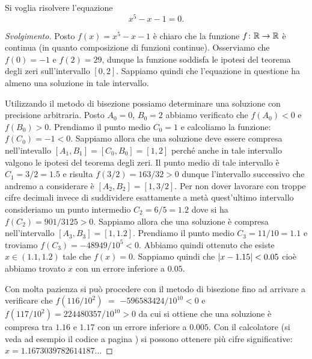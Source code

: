 \begin{example}\label{ex:75445}
Si voglia risolvere l'equazione
\[
  x^5-x-1=0.
\]
\end{example}
%
\begin{proof}[Svolgimento]
Posto $f(x) = x^5-x-1$ è chiaro che la funzione $f\colon {\mathbb R}\to {\mathbb R}$
è continua (in quanto composizione di funzioni continue).
Osserviamo che $f(0) = -1$ e $f(2)=29$, dunque la funzione
soddisfa le ipotesi del teorema degli zeri sull'intervallo $[0,2]$.
Sappiamo quindi che l'equazione in questione ha almeno una soluzione
in tale intervallo.

Utilizzando il metodo di bisezione possiamo determinare una soluzione
con precisione arbitraria. Posto $A_0=0$, $B_0=2$ abbiamo verificato che
$f(A_0)<0$ e $f(B_0)>0$.
Prendiamo il punto
medio $C_0=1$ e calcoliamo la funzione: $f(C_0)=-1 < 0$. Sappiamo
allora che una soluzione deve essere compresa nell'intevallo
$[A_1,B_1] = [C_0,B_0] = [1,2]$ perché anche in tale intervallo valgono le ipotesi
del teorema degli zeri.
Il punto medio di tale intervallo è $C_1=3/2 = 1.5$
e risulta $f(3/2) = 163/32>0$ dunque l'intervallo successivo
che andremo a considerare è $[A_2,B_2]=[1,3/2]$.
Per non dover lavorare con troppe cifre decimali invece di suddividere
esattamente a metà quest'ultimo intervallo consideriamo un punto
intermedio $C_2 = 6/5 = 1.2$ dove si ha $f(C_2)=901/3125>0$.
Sappiamo allora che una soluzione è compresa nell'intervallo
$[A_3,B_3] = [1,1.2]$. Prendiamo il punto medio $C_3=11/10=1.1$
e troviamo $f(C_3) = -48949/10^5 <0$. Abbiamo quindi ottenuto
che esiste $x\in (1.1,1.2)$ tale che $f(x)=0$. Sappiamo quindi
che ${\left|x-1.15\right|} < 0.05$ cioè abbiamo trovato $x$ con un errore
inferiore a $0.05$.

Con molta pazienza si può procedere
con il metodo di bisezione fino ad arrivare a verificare
che $f(116/10^2)$ $=$ $-596583424/10^{10}<0$ e $f(117/10^2)=224480357/10^{10}>0$ da cui
si ottiene che una soluzione è compresa tra $1.16$ e $1.17$ con un errore
inferiore a $0.005$.
Con il calcolatore (si veda ad esempio il codice a pagina \pageref{code:bisection})
si possono ottenere più cifre significative: $x=1.1673039782614187\ldots$
\end{proof}

